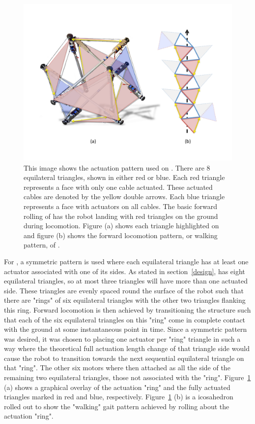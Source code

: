 \begin{figure}[thbp]
    \vspace{-0.5in}
    \centering
    \includegraphics[width=0.8\linewidth]{tex/img/SB_RedvBlue_with_Walk}
    \vspace{-0.4in}
    \caption{
    This image shows the actuation pattern used on \SB{}. There are 8 equilateral triangles, shown in either red or blue.
    Each red triangle represents a face with only one cable actuated. 
    These actuated cables are denoted by the yellow double arrows. 
    Each blue triangle represents a face with actuators on all cables. 
    The basic forward rolling of \SB{} has the robot landing with red triangles on the ground during locomotion. 
    Figure (a) shows each triangle highlighted on \SB{} and figure (b) shows the forward locomotion pattern, or walking pattern, of \SB{}.
    }
    \label{fig:actuator_pattern}
    \vspace{-0.1in}
\end{figure}

For \SB{}, a symmetric pattern is used where each equilateral triangle has at least one actuator associated with one of its sides.
As stated in section~\ref{design}, \SB{} has eight equilateral triangles, so at most three triangles will have more than one actuated side.
These triangles are evenly spaced round the surface of the robot such that there are "rings" of six equilateral triangles with the other two triangles flanking this ring.
Forward locomotion is then achieved by transitioning the structure such that each of the six equilateral triangles on this "ring" come in complete contact with the ground at some instantaneous point in time.
Since a symmetric pattern was desired, it was chosen to placing one actuator per "ring" triangle in such a way where the theoretical full actuation length change of that triangle side would cause the robot to transition towards the next sequential equilateral triangle on that "ring".
The other six motors where then attached as all the side of the remaining two equilateral triangles, those not associated with the "ring".
Figure~\ref{fig:actuator_pattern} (a) shows a graphical overlay of the actuation "ring" and the fully actuated triangles marked in red and blue, respectively.
Figure~\ref{fig:actuator_pattern} (b) is a icosahedron rolled out to show the "walking" gait pattern achieved by rolling about the actuation "ring".

